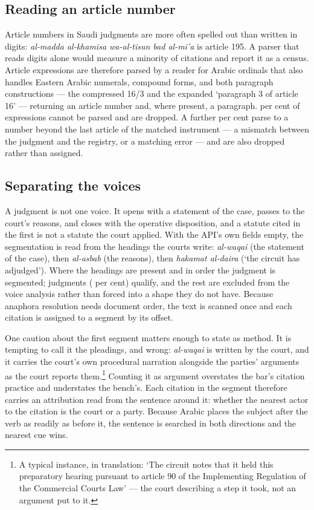 \documentclass[11pt]{article}
\begin{document}
\subsection{Reading an article number}

Article numbers in Saudi judgments are more often spelled out than written in
digits: \emph{al-madda al-khamisa wa-al-tisun bad al-mi'a} is article 195. A parser that
reads digits alone would measure a minority of citations and report it as a
census. Article expressions are therefore parsed by a reader for Arabic
ordinals that also handles Eastern Arabic numerals, compound forms, and both
paragraph constructions --- the compressed \mbox{16/3} and the expanded
`paragraph 3 of article 16' --- returning an article number and, where
present, a paragraph. \nUnparsedShare{} per cent of
expressions cannot be parsed and are dropped. A further \nOutOfRangeShare{}
per cent parse to a number beyond the last article of the matched instrument
--- a mismatch between the judgment and the registry, or a matching error ---
and are also dropped rather than assigned.

\subsection{Separating the voices}
\label{sec:voices}

A judgment is not one voice. It opens with a statement of the case, passes to
the court's reasons, and closes with the operative disposition, and a statute
cited in the first is not a statute the court applied. With the API's own
fields empty, the segmentation is read from the headings the courts write:
\emph{al-waqai} (the statement of the case), then \emph{al-asbab} (the
reasons), then \emph{hakamat al-daira} (`the circuit has adjudged'). Where
the headings are
present and in order the judgment is segmented; \nSegmented{} judgments
(\nSegmentedShare{} per cent) qualify, and the rest are excluded from the
voice analysis rather than forced into a shape they do not have. Because
anaphora resolution needs document order, the text is scanned once and each
citation is assigned to a segment by its offset.

One caution about the first segment matters enough to state as method. It is
tempting to call it the pleadings, and wrong: \emph{al-waqai} is written by
the court, and it carries the court's own procedural narration alongside the
parties' arguments as the court reports them.\footnote{A typical instance, in
translation: `The circuit notes that it held this preparatory hearing
pursuant to article 90 of the Implementing Regulation of the Commercial
Courts Law' --- the court describing a step it took, not an argument put to
it.} Counting
it as argument overstates the bar's citation practice and understates the
bench's. Each citation in the segment therefore carries an attribution read
from the sentence around it: whether the nearest actor to the citation is the
court or a party. Because Arabic places the subject after the verb as readily
as before it, the sentence is searched in both directions and the nearest cue
wins.
\end{document}
